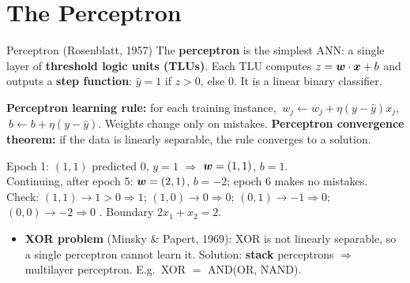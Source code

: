 \section{The Perceptron}
\begin{dfn}{Perceptron (Rosenblatt, 1957)}
The \textbf{perceptron} is the simplest ANN: a single layer of \textbf{threshold logic units (TLUs)}. Each TLU computes $z=\boldsymbol{w}\cdot\boldsymbol{x}+b$ and outputs a \textbf{step function}: $\hat y=1$ if $z>0$, else $0$. It is a linear binary classifier.
\end{dfn}
\textbf{Perceptron learning rule:} for each training instance, $\ w_j\leftarrow w_j+\eta(y-\hat y)x_j$, $\ b\leftarrow b+\eta(y-\hat y)$. Weights change only on mistakes.
\textbf{Perceptron convergence theorem:} if the data is linearly separable, the rule converges to a solution.

\begin{numer}[: perceptron learns AND ($\eta=1$, start $\vect w=(0,0)$, $b=0$)]
Epoch 1: $(1,1)$ predicted 0, $y=1$ $\Rightarrow$ $\boldsymbol{w}=(1,1)$, $b=1$.\\
Continuing, after epoch 5: $\boldsymbol{w}=(2,1)$, $b=-2$; epoch 6 makes no mistakes.\\
Check: $(1,1)\to1>0\Rightarrow1$; $(1,0)\to0\Rightarrow0$; $(0,1)\to-1\Rightarrow0$; $(0,0)\to-2\Rightarrow0$ \checkmark. Boundary $2x_1+x_2=2$.
\end{numer}

\begin{itemize}
  \item \textbf{XOR problem} (Minsky \& Papert, 1969): XOR is not linearly separable, so a single perceptron cannot learn it. Solution: \textbf{stack} perceptrons $\Rightarrow$ multilayer perceptron. E.g.\ XOR $=$ AND(OR, NAND).
\end{itemize}


